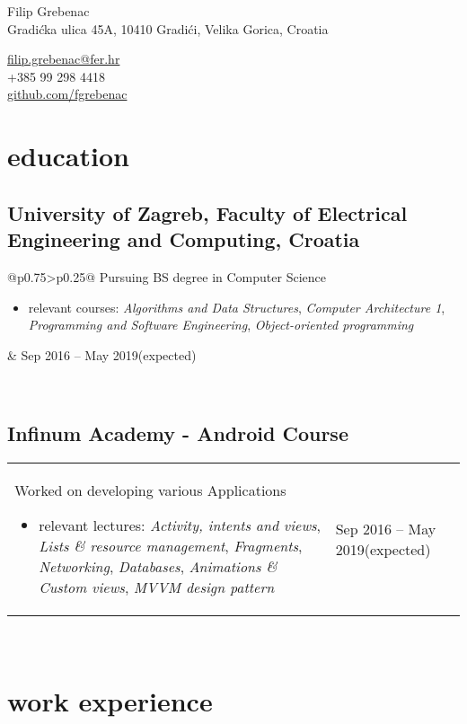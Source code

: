 \documentclass[a4paper]{article}
\makeatletter
\newlength{\tablewidth}
\newenvironment{period}[2]{%
\newcommand{\sarma}{#2}%
\setlength{\tablewidth}{\linewidth}
\addtolength{\tablewidth}{-2\tabcolsep}
\begin{tabular}{@{}p{0.75\tablewidth}>{\raggedleft\arraybackslash}p{0.25\tablewidth}@{}}%
#1 \newline
\begin{itemize}
}{%
\end{itemize} & \sarma \\%
\end{tabular}\\
}
\makeatother
\begin{document}
\fontfamily{\sfdefault}
\selectfont

\begin{minipage}{.5\textwidth}
\LARGE{Filip Grebenac}\\
\normalsize{Gradićka ulica 45A, 10410 Gradići, Velika Gorica, Croatia}
\end{minipage}%
\begin{minipage}{.5\textwidth}
\raggedleft
\href{mailto:ime.prezime@gmail.com}{filip.grebenac@fer.hr} \\
+385 99 298 4418 \\
\href{https://github.com/iprezime}{github.com/fgrebenac}
\end{minipage}

\vspace{1em}


\section{education}
\subsection{University of Zagreb, Faculty of Electrical Engineering and Computing, Croatia}
\begin{period}{Pursuing BS degree in Computer Science}{Sep 2016 -- May 2019\linebreak(expected)}
    \item relevant courses:
        \textit{Algorithms and Data Structures},
        \textit{Computer Architecture 1},
        \textit{Programming and Software Engineering},
        \textit{Object-oriented programming}
\end{period}

\subsection{Infinum Academy - Android Course}
\begin{period}{Worked on developing various Applications}{Jul 2018 -- Aug 2018}
    \item relevant lectures:
        \textit{Activity, intents and views},
        \textit{Lists \& resource management},
        \textit{Fragments},
        \textit{Networking},
        \textit{Databases},
        \textit{Animations \& Custom views},
        \textit{MVVM design pattern}
\end{period}

\section{work experience}
\end{document}
